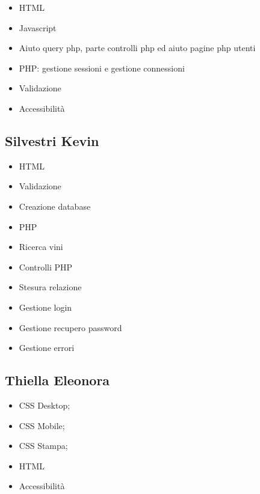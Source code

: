 \begin{itemize}
	\item HTML
	\item Javascript
	\item Aiuto query php, parte controlli php ed aiuto pagine php utenti
	\item PHP: gestione sessioni e gestione connessioni
	\item Validazione
	\item Accessibilità
\end{itemize}

\subsection{Silvestri Kevin}

\begin{itemize}
	\item HTML
	\item Validazione
	\item Creazione database
	\item PHP
	\item Ricerca vini
	\item Controlli PHP
	\item Stesura relazione
	\item Gestione login
	\item Gestione recupero password
	\item Gestione errori
\end{itemize}

\subsection{Thiella Eleonora}

\begin{itemize}
	\item CSS Desktop;
	\item CSS Mobile;
	\item CSS Stampa;
	\item HTML
	\item Accessibilità
\end{itemize}

